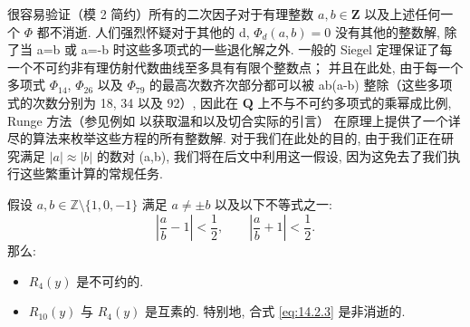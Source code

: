 很容易验证（模 2 简约）所有的二次因子对于有理整数 \(a,b \in \mathbf{Z}\) 以及上述任何一个 \(\Phi\) 都不消逝. 
人们强烈怀疑对于其他的 d, \(\Phi_d(a,b)=0\) 没有其他的整数解, 
除了当 a=b 或 a=-b 时这些多项式的一些退化解之外. 
一般的 Siegel 定理保证了每一个不可约非有理仿射代数曲线至多具有有限个整数点； 
并且在此处, 由于每一个多项式 \(\Phi_{14}\), \(\Phi_{26}\) 以及 \(\Phi_{79}\) 
的最高次数齐次部分都可以被 ab(a-b) 整除（这些多项式的次数分别为 18, 34 以及 92）, 
因此在 \(\mathbf{Q}\) 上不与不可约多项式的乘幂成比例, 
Runge 方法（参见例如 \cite[第 4 节]{Mas16} 以获取温和以及切合实际的引言） 
在原理上提供了一个详尽的算法来枚举这些方程的所有整数解. 
对于我们在此处的目的, 由于我们正在研究满足 \(|a| \approx |b|\) 的数对 (a,b), 
我们将在后文中利用这一假设, 
因为这免去了我们执行这些繁重计算的常规任务.

\begin{lemma}\label{lem:14.2.4}
假设 \(a, b \in \mathbb{Z} \setminus \{1, 0, -1\}\) 满足 \(a \neq \pm b\) 
以及以下不等式之一:
\[ \left|\frac{a}{b} - 1\right| < \frac{1}{2}, \qquad \left|\frac{a}{b} + 1\right| < \frac{1}{2}. \]
那么:
\begin{itemize}
  \item[(1)] \(R_4(y)\) 是不可约的.
  \item[(2)] \(R_{10}(y)\) 与 \(R_4(y)\) 是互素的. 特别地, 合式 \eqref{eq:14.2.3} 是非消逝的.
\end{itemize}
\end{lemma}

